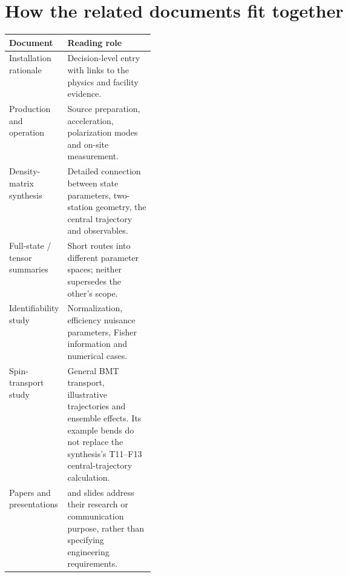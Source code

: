 \documentclass[11pt,a4paper]{article}
\begin{document}
\section{How the related documents fit together}
\noindent\begin{tabularx}{\linewidth}{@{}p{0.28\linewidth}Y@{}}
\toprule
Document & Reading role \\
\midrule
Installation rationale & Decision-level entry with links to the physics and facility evidence.\\
Production and operation & Source preparation, acceleration, polarization modes and on-site measurement.\\
Density-matrix synthesis & Detailed connection between state parameters, two-station geometry, the central trajectory and observables.\\
Full-state / tensor summaries & Short routes into different parameter spaces; neither supersedes the other's scope.\\
Identifiability study & Normalization, efficiency nuisance parameters, Fisher information and numerical cases.\\
Spin-transport study & General BMT transport, illustrative trajectories and ensemble effects. Its example bends do not replace the synthesis's T11--F13 central-trajectory calculation.\\
Papers and presentations &  and slides address their research or communication purpose, rather than specifying engineering requirements.\\
\bottomrule
\end{tabularx}
\end{document}
